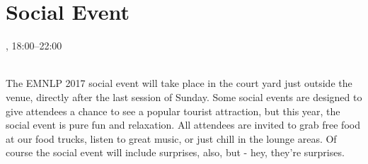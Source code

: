 \clearpage
\section{Social Event}
\setheaders{}{\daydateyear}

\begin{center}



\daydateyear, 18:00--22:00\vspace{1em}\\
\SocialEventLoc\\
\end{center}

The  EMNLP 2017 social event will take place in the court yard just outside the venue, directly after the last session of Sunday. Some social events are designed to give attendees a chance to see a popular tourist attraction, but this year, the social event is pure fun and relaxation. All attendees are invited to grab free food at our food trucks, listen to great music, or just chill in the lounge areas. Of course the social event will include surprises, also, but - hey, they’re surprises. 
